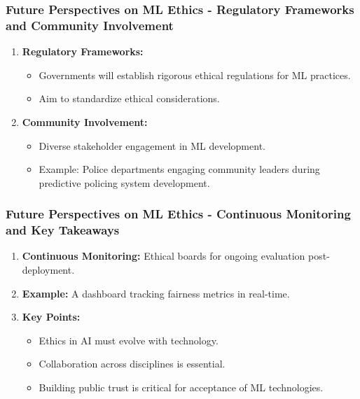 \documentclass[aspectratio=169]{beamer}
\begin{document}
\begin{frame}[fragile]
  \frametitle{Future Perspectives on ML Ethics - Regulatory Frameworks and Community Involvement}
  \begin{enumerate}
    \item \textbf{Regulatory Frameworks:} 
    \begin{itemize}
      \item Governments will establish rigorous ethical regulations for ML practices.
      \item Aim to standardize ethical considerations.
    \end{itemize}
    \item \textbf{Community Involvement:} 
    \begin{itemize}
      \item Diverse stakeholder engagement in ML development.
      \item Example: Police departments engaging community leaders during predictive policing system development.
    \end{itemize}
  \end{enumerate}
\end{frame}

\begin{frame}[fragile]
  \frametitle{Future Perspectives on ML Ethics - Continuous Monitoring and Key Takeaways}
  \begin{enumerate}
    \item \textbf{Continuous Monitoring:} Ethical boards for ongoing evaluation post-deployment.
    \item \textbf{Example:} A dashboard tracking fairness metrics in real-time.
    
    \item \textbf{Key Points:}
    \begin{itemize}
      \item Ethics in AI must evolve with technology.
      \item Collaboration across disciplines is essential.
      \item Building public trust is critical for acceptance of ML technologies.
    \end{itemize}
  \end{enumerate}
\end{frame}
\end{document}
